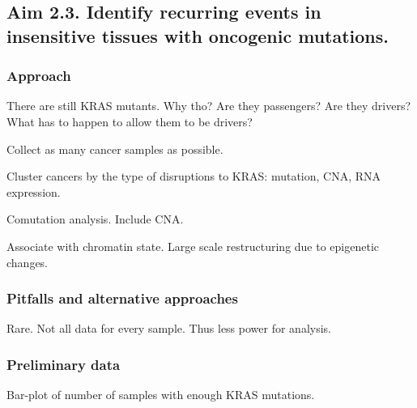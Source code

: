 \subsection*{Aim 2.3. Identify recurring events in insensitive tissues with oncogenic \KRAS{} mutations.}

\subsubsection*{Approach}

There are still KRAS mutants. 
Why tho? 
Are they passengers? 
Are they drivers?
What has to happen to allow them to be drivers?

Collect as many cancer samples as possible.

Cluster cancers by the type of disruptions to KRAS: mutation, CNA, RNA expression.

Comutation analysis.
Include CNA.

Associate with chromatin state. 
Large scale restructuring due to epigenetic changes.

\subsubsection*{Pitfalls and alternative approaches}

Rare.
Not all data for every sample.
Thus less power for analysis.

\subsubsection*{Preliminary data}

Bar-plot of number of samples with enough KRAS mutations.
